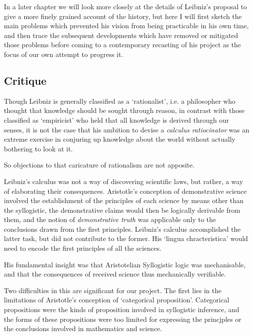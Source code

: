 In a later chapter we will look more closely at the details of Leibniz's proposal to give a more finely grained account of the history, but here I will first sketch the main problems which prevented his vision from being practicable in his own time, and then trace the subsequent developments which have removed or mitigated those problems before coming to a contemporary recasting of his project as the focus of our own attempt to progress it.

\subsection{Critique}

Though Leibniz is generally classified as a `rationalist', i.e. a philosopher who thought that knowledge should be sought through reason, in contrast with those classified as `empiricist' who held that all knowledge is derived through our senses, it is not the case that his ambition to devise a \emph{calculus ratiocinator} was an extreme exercise in conjuring up knowledge about the world without actually bothering to look at it.

So objections to that caricature of rationalism are not apposite.

Leibniz's calculus was not a way of discovering scientific laws, but rather, a way of elaborating their consequences.
Aristotle's conception of demonstrative science involved the establishment of the principles of each science by means other than the syllogistic, the demonstrative claims would then be logically derivable from them, and the notion of \emph{demonstrative truth} was applicable only to the conclusions drawn from the first principles.
Leibniz's calculus accomplished the latter task, but did not contribute to the former.
His `lingua chracteristica' would need to encode the first principles of all the sciences.

His fundamental insight was that Aristotelian Syllogistic logic was mechanisable, and that the consequences of received science thus mechanically verifiable.

Two difficulties in this are significant for our project.
The first lies in the limitations of Aristotle's conception of `categorical proposition'.
Categorical propositions were the kinds of proposition involved in syllogistic inference, and the forms of these propositions were too limited for expressing the princjples or the conclusions involved in mathematics and science.

